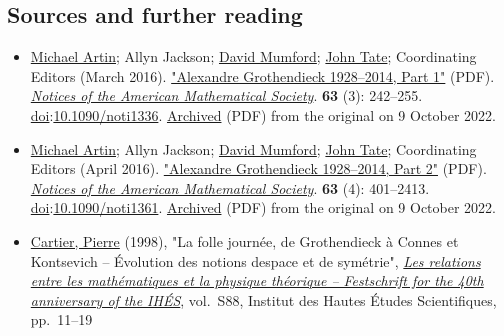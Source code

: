 \subsection{Sources and further reading}\label{Sources_and_further_reading}


\begin{itemize}
\tightlist
\item
  \href{https://en.wikipedia.org/wiki/Michael_Artin}{Michael Artin}; Allyn Jackson; \href{https://en.wikipedia.org/wiki/David_Mumford}{David Mumford}; \href{https://en.wikipedia.org/wiki/John_Tate_(mathematician)}{John Tate}; Coordinating Editors (March 2016). \href{https://www.ams.org/publications/journals/notices/201603/rnoti-p242.pdf}{"Alexandre Grothendieck 1928--2014, Part 1"} {(PDF)}. \emph{\href{https://en.wikipedia.org/wiki/Notices_of_the_American_Mathematical_Society}{Notices of the American Mathematical Society}}. \textbf{63} (3): {242--}255. \href{https://en.wikipedia.org/wiki/Doi_(identifier)}{doi}:{\href{https://doi.org/10.1090\%2Fnoti1336}{10.1090/noti1336}}. \href{https://ghostarchive.org/archive/20221009/https://www.ams.org/publications/journals/notices/201603/rnoti-p242.pdf}{Archived} {(PDF)} from the original on 9 October 2022.{}
\item
  \href{https://en.wikipedia.org/wiki/Michael_Artin}{Michael Artin}; Allyn Jackson; \href{https://en.wikipedia.org/wiki/David_Mumford}{David Mumford}; \href{https://en.wikipedia.org/wiki/John_Tate_(mathematician)}{John Tate}; Coordinating Editors (April 2016). \href{https://www.ams.org/publications/journals/notices/201604/rnoti-p401.pdf}{"Alexandre Grothendieck 1928--2014, Part 2"} {(PDF)}. \emph{\href{https://en.wikipedia.org/wiki/Notices_of_the_American_Mathematical_Society}{Notices of the American Mathematical Society}}. \textbf{63} (4): {401--}2413. \href{https://en.wikipedia.org/wiki/Doi_(identifier)}{doi}:{\href{https://doi.org/10.1090\%2Fnoti1361}{10.1090/noti1361}}. \href{https://ghostarchive.org/archive/20221009/https://www.ams.org/publications/journals/notices/201604/rnoti-p401.pdf}{Archived} {(PDF)} from the original on 9 October 2022.{}
\item
  \href{https://en.wikipedia.org/wiki/Pierre_Cartier_(mathematician)}{Cartier, Pierre} (1998), "La folle journée, de Grothendieck à Connes et Kontsevich -- Évolution des notions d\textquotesingle espace et de symétrie", \href{http://www.numdam.org/item?id=PMIHES_1998__S88__23_0}{\emph{Les relations entre les mathématiques et la physique théorique -- Festschrift for the 40th anniversary of the IHÉS}}, vol.{~}S88, Institut des Hautes Études Scientifiques, pp.{~}{11--}19{}


\end{itemize}
